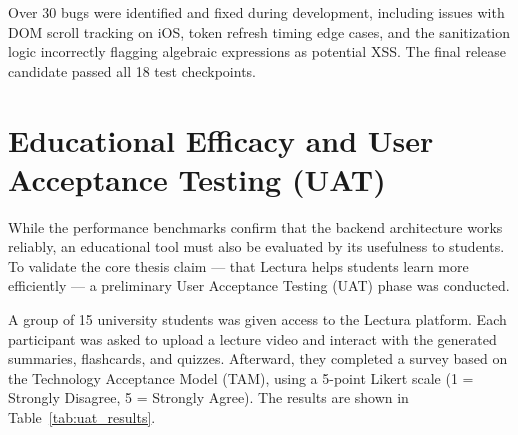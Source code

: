 Over 30 bugs were identified and fixed during development, including issues with DOM scroll tracking on iOS, token refresh timing edge cases, and the sanitization logic incorrectly flagging algebraic expressions as potential XSS. The final release candidate passed all 18 test checkpoints.

\section{Educational Efficacy and User Acceptance Testing (UAT)}
While the performance benchmarks confirm that the backend architecture works reliably, an educational tool must also be evaluated by its usefulness to students. To validate the core thesis claim — that Lectura helps students learn more efficiently — a preliminary User Acceptance Testing (UAT) phase was conducted.

A group of 15 university students was given access to the Lectura platform. Each participant was asked to upload a lecture video and interact with the generated summaries, flashcards, and quizzes. Afterward, they completed a survey based on the Technology Acceptance Model (TAM), using a 5-point Likert scale (1 = Strongly Disagree, 5 = Strongly Agree). The results are shown in Table~\ref{tab:uat_results}.

\begin{table}[htbp]
\centering
{}
\vspace{6pt}
\caption{User Acceptance Testing (UAT) results across 15 participants ($N=15$), using a 5-point Likert scale.}
\label{tab:uat_results}
\end{table}

